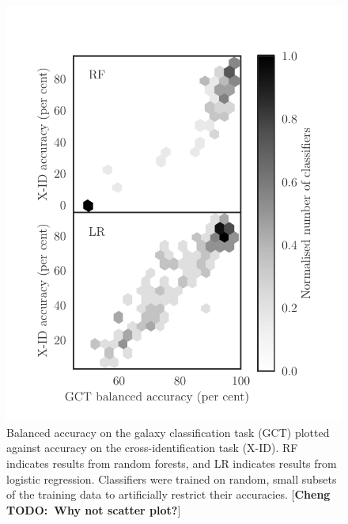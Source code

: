 \documentclass[fleqn,usenatbib,usedcolumn]{mnras}
\newcommand{\cheng}[1]{ {\color{teal}[{\bf Cheng TODO:~{#1}}]} }
\begin{document}
    \begin{figure}
      \centering
      \includegraphics[width=\columnwidth]{gct-to-xid.pdf}
      \caption{Balanced accuracy on the galaxy classification task (GCT) plotted
      against accuracy on the cross-identification task (X-ID). RF indicates
      results from random forests, and LR indicates results from logistic
      regression. Classifiers were trained on random, small subsets of the
      training data to artificially restrict their accuracies.\cheng{Why not scatter plot?}
      \label{fig:gct-to-xid}}
    \end{figure}
\end{document}
